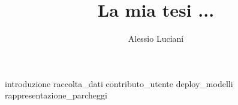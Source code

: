 \documentclass[binding=0.6cm,TFA]{sapthesis}
\title{La mia tesi ...} \author{Alessio Luciani}
\begin{document}
\frontmatter
\maketitle
\dedication{Alla mia famiglia}
\tableofcontents
\mainmatter
\large
{introduzione}
{raccolta_dati}
{contributo_utente}
{deploy_modelli}
{rappresentazione_parcheggi}
\backmatter
\cleardoublepage
{} %
\end{document}
